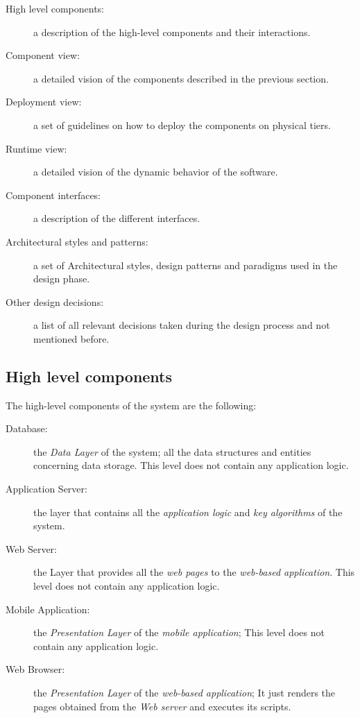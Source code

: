 \documentclass{article}
\begin{document}
	\bigskip
	\begin{description}
	\item [High level components:] a description of the high-level components and their interactions.
	\item [Component view:] a detailed vision of the components described in the previous section.
	\item [Deployment view:] a set of guidelines on how to deploy the components on physical tiers.
	\item [Runtime view:] a detailed vision of the dynamic behavior of the software.
	\item [Component interfaces:] a description of the different interfaces.
	\item [Architectural styles and patterns:] a set of Architectural styles, design patterns and paradigms used in the design phase.
	\item [Other design decisions:] a list of all relevant decisions taken during the design process and not mentioned before.
	\end{description}


	\subsection{High level components}

	The high-level components of the system are the following:

	\begin{description}
	\item [Database:] the \textit{Data Layer} of the system; all the data structures and entities concerning data storage. This level does not contain any application logic.
	\item [Application Server:] the layer that contains all the \textit{application logic} and \textit{key algorithms} of the system.
	\item [Web Server:] the Layer that provides all the \textit{web pages} to the \textit{web-based application}. This level does not contain any application logic.
	\item [Mobile Application:] the \textit{Presentation Layer} of the \textit{mobile application}; This level does not contain any application logic.
	\item [Web Browser:] the \textit{Presentation Layer} of the \textit{web-based application}; It just renders the pages obtained from the \textit{Web server} and executes its scripts.
	\end{description}
\end{document}
